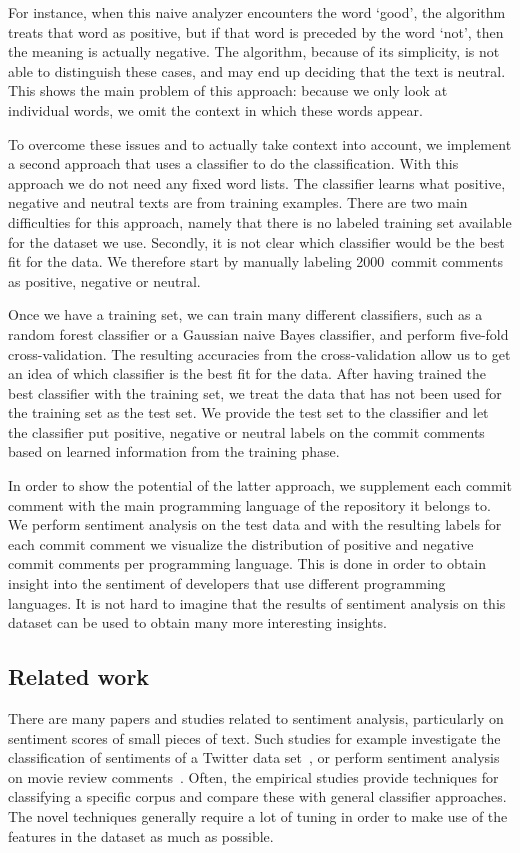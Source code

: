 \documentclass{article}
\begin{document}
For instance, when this naive analyzer encounters the word `good', the 
algorithm treats that word as positive, but if that word is preceded by the 
word `not', then the meaning is actually negative. The algorithm, because of 
its simplicity, is not able to distinguish these cases, and may end up deciding 
that the text is neutral. This shows the main problem of this approach: because 
we only look at individual words, we omit the context in which these words 
appear.

To overcome these issues and to actually take context into account, we implement
a second approach that uses a classifier to do the classification. With this
approach we do not need any fixed word lists. The classifier learns what
positive, negative and neutral texts are from training examples. There are two
main difficulties for this approach, namely that there is no labeled training
set available for the dataset we use. Secondly, it is not clear which 
classifier would be the best fit for the data. We therefore start by manually 
labeling 2000~commit comments as positive, negative or neutral.

Once we have a training set, we can train many different classifiers, such as 
a random forest classifier or a Gaussian naive Bayes classifier, and perform 
five-fold cross-validation. The resulting accuracies from the cross-validation 
allow us to get an idea of which classifier is the best fit for the data. After 
having trained the best classifier with the training set, we treat the data 
that has not been used for the training set as the test set. We provide the 
test set to the classifier and let the classifier put positive, negative or 
neutral labels on the commit comments based on learned information from the 
training phase.

In order to show the potential of the latter approach, we supplement each 
commit comment with the main programming language of the repository it belongs 
to. We perform sentiment analysis on the test data and with the resulting 
labels for each commit comment we visualize the distribution of positive and 
negative commit comments per programming language. This is done in order to 
obtain insight into the sentiment of developers that use different programming 
languages. It is not hard to imagine that the results of sentiment analysis on 
this dataset can be used to obtain many more interesting insights.

\subsection{Related work}\label{sec:related-work}
There are many papers and studies related to sentiment analysis, particularly 
on sentiment scores of small pieces of text. Such studies for example 
investigate the classification of sentiments of a Twitter data 
set~\cite{agarwal2011twitter,kouloumpis2011twitter}, or perform sentiment 
analysis on movie review comments~\cite{yessenov2009sentiment}. Often, the 
empirical studies provide techniques for classifying a specific corpus and 
compare these with general classifier approaches. The novel techniques generally
require a lot of tuning in order to make use of the features in the dataset as 
much as possible.
\end{document}
